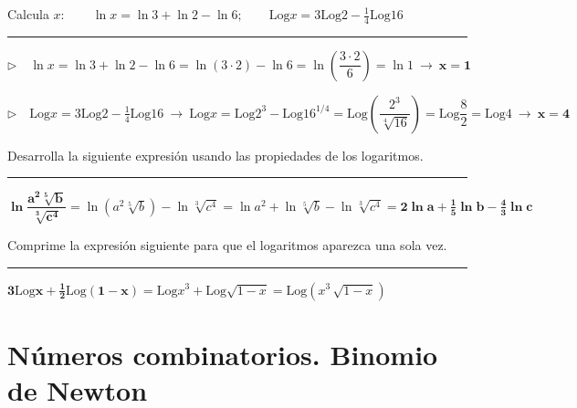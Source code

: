 \begin{miejercicio}

Calcula $x:\qquad \ln x=\ln 3+\ln 2-\ln 6;\qquad \mathrm{Log}x	=3\mathrm{Log}2-\frac 1 4 \mathrm{Log}16$

\rule{300pt}{0.1pt}

$\triangleright \quad \ln x=\ln 3+\ln 2-\ln 6=\ln(3\cdot 2)-\ln 6=\ln\left( \dfrac {3\cdot 2}{6} \right)=\ln 1 \ \to \ \boldsymbol{x=1} $

\vspace{2mm} $\triangleright \quad \mathrm{Log}x	=3\mathrm{Log}2-\frac 1 4 \mathrm{Log}16 \ \to \ \mathrm{Log} x= \mathrm{Log}2^3-\mathrm{Log}16^{1/4}= \mathrm{Log} \left( \dfrac{2^3}{\sqrt[4]{16}} \right)=\mathrm{Log} \dfrac 8 2 = \mathrm{Log} 4 \ \to \ \boldsymbol{x=4}$

\end{miejercicio}


\begin{miejercicio}

Desarrolla la siguiente expresión usando las propiedades de los logaritmos.


\rule{300pt}{0.1pt}

\vspace{2mm} $\boldsymbol{ \ln \dfrac{a^2\sqrt[5]{b}}{\sqrt[3]{c^4}}} = \ln(a^2\sqrt[5]{b})-\ln\sqrt[3]{c^4}=\ln a^2 +\ln \sqrt[5]{b}-\ln\sqrt[3]{c^4}=\boldsymbol{ 2\ln a +\frac 1 5 \ln b - \frac 4 3 \ln c }$ 
	
\end{miejercicio}

\begin{miejercicio}

Comprime la expresión siguiente para que el logaritmos aparezca una sola vez.


\rule{300pt}{0.1pt}

\vspace{2mm} $\boldsymbol{3\mathrm{Log} x +\frac 12 \mathrm{Log} (1-x)}=\mathrm{Log} x^3  + \mathrm{Log}  \sqrt{1-x}= \mathrm{Log} \left( x^3\, \sqrt{1-x} \right)$
	
\end{miejercicio}


\vspace{1cm}
\section{Números combinatorios. Binomio de Newton}
\vspace{0.5cm}

